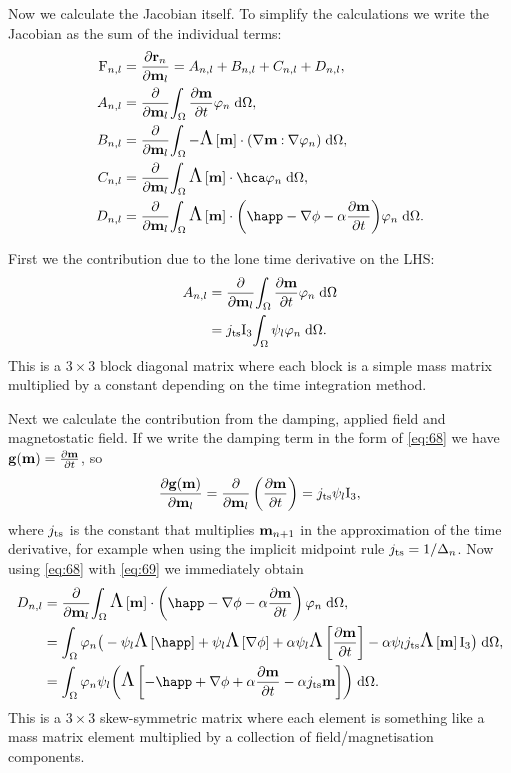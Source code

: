 Now we calculate the Jacobian itself. 
To simplify the calculations we write the Jacobian as the sum of the individual terms:
\begin{equation}
  \begin{aligned}
    \Fm_{n,l} &= \pd{\rllgv_n}{\mv_l} = A_{n,l} + B_{n,l} + C_{n,l} + D_{n,l}, \\
    A_{n,l} &= \pd{}{\mv_l} \intd{\dmdt \tbf_n}, \\
    B_{n,l} &= \pd{}{\mv_l} \intd{- \skewm{\mv} \cdot (\grad \mv \compdot \grad \tbf_n)}, \\
    C_{n,l} &= \pd{}{\mv_l} \intd{ \skewm{\mv} \cdot \hca  \tbf_n}, \\
    D_{n,l} &= \pd{}{\mv_l} \intd{  \skewm{\mv} \cdot \bigb{ \happ - \nabla \phi - \dampc \dmdt} \tbf_n}.
  \end{aligned}
\end{equation}

First we the contribution due to the lone time derivative on the LHS:
\begin{equation}
  \begin{aligned}
    A_{n,l} &= \frac{\partial }{\partial \mathbf{m}_l} {\int_{\Omega}  \frac{\partial \mathbf{m}}{\partial t} \varphi_n  {\; \text{d}} {\Omega}} \\
           &= j_\text{ts} \mathrm{I}_3 {\int_{\Omega}  \psi_l \varphi_n {\; \text{d}} {\Omega}}.
  \end{aligned}
\end{equation}
This is a $3\times3$ block diagonal matrix where each block is a simple mass matrix multiplied by a constant depending on the time integration method.

Next we calculate the contribution from the damping, applied field and magnetostatic field.
If we write the damping term in the form of \eqref{eq:68} we have ${\mathbf{g}}(\mathbf{m}) = \frac{\partial \mathbf{m}}{\partial t}$, so
\begin{equation}
  \label{eq:69}
  \frac{\partial {\mathbf{g}}(\mathbf{m})}{\partial \mathbf{m}_l} = \frac{\partial }{\partial \mathbf{m}_l} \left(\frac{\partial \mathbf{m}}{\partial t} \right) = j_\text{ts} \psi_l \mathrm{I}_3,
\end{equation}
where $j_\text{ts}$ is the constant that multiplies $\mathbf{m}_{n+1}$ in the approximation of the time derivative, for example when using the implicit midpoint rule $j_\text{ts} = 1/\Delta_{n}$.
Now using \eqref{eq:68} with \eqref{eq:69} we immediately obtain
\begin{equation}
  \begin{aligned} 
    D_{n,l} &= \pd{}{\mv_l} \intd{  \skewm{\mv} \cdot
      \left( \happ - \nabla \phi - \dampc \dmdt
      \right) \tbf_n}, \\
    &= \int_\magd \tbf_n \big( -\sbf_l\skewm{\happ} + \sbf_l\skewm{\nabla \phi} + \dampc\sbf_l \skewm{\dmdt} - \dampc\sbf_l \jts \skewm{\mv} \Idm_3
    \big) \d\magd, \\
    &= \intd{ \tbf_n \sbf_l \bigb{ \skewm{-\happ + \nabla \phi 
          + \dampc \dmdt - \dampc \jts \mv}}}. \\
  \end{aligned}
\end{equation}
This is a $3\times3$ skew-symmetric matrix where each element is something like a mass matrix element multiplied by a collection of field/magnetisation components.

